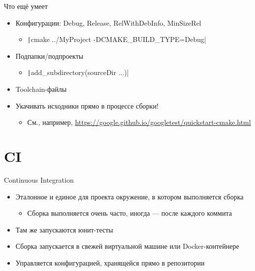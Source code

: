 \documentclass{../../slides-style}
\begin{document}
    \begin{frame}{Что ещё умеет}
        \begin{itemize}
            \item Конфигурации: Debug, Release, RelWithDebInfo, MinSizeRel
            \begin{itemize}
                \item \texttt|cmake ../MyProject -DCMAKE_BUILD_TYPE=Debug|
            \end{itemize}
            \item Подпапки/подпроекты
            \begin{itemize}
                \item \texttt|add_subdirectory(sourceDir ...)|
            \end{itemize}
            \item Toolchain-файлы
            \item Укачивать исходники прямо в процессе сборки!
            \begin{itemize}
                \item См., например, \url{https://google.github.io/googletest/quickstart-cmake.html}
            \end{itemize}
        \end{itemize}
    \end{frame}

    \section{CI}

    \begin{frame}{Continuous Integration}
        \begin{itemize}
            \item Эталонное и единое для проекта окружение, в котором выполняется сборка
            \begin{itemize}
                \item Сборка выполняется очень часто, иногда --- после каждого коммита
            \end{itemize}
            \item Там же запускаются юнит-тесты
            \item Сборка запускается в свежей виртуальной машине или Docker-контейнере
            \item Управляется конфигурацией, хранящейся прямо в репозитории
        \end{itemize}
    \end{frame}
\end{document}

